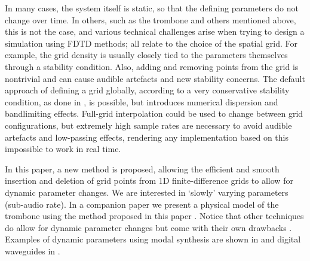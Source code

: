 In many cases, the system itself is static, so that the defining parameters do not change over time. In others, such as the trombone and others mentioned above, this is not the case, and various technical challenges arise when trying to design a simulation using FDTD methods; all relate to the choice of the spatial grid. For example, the grid density is usually closely tied to the parameters themselves through a stability condition.
Also, adding and removing points from the grid is nontrivial and can cause audible artefacts and new stability concerns. The default approach of defining a grid globally, according to a very conservative stability condition, as done in \cite{Willemsen2019}, is possible, but introduces numerical dispersion and bandlimiting effects. Full-grid interpolation \cite[Ch. 5]{bilbao2009} could be used to change between grid configurations, but extremely high sample rates are necessary to avoid audible artefacts and low-passing effects, rendering any implementation based on this impossible to work in real time. 

In this paper, a new method is proposed, allowing the efficient and smooth insertion and deletion of grid points from 1D finite-difference grids to allow for dynamic parameter changes. We are interested in `slowly' varying parameters (sub-audio rate). In a companion paper we present a physical model of the trombone using the method proposed in this paper \cite{Willemsen2021}. Notice that other techniques do allow for dynamic parameter changes but come with their own drawbacks \cite{bilbao2009}. Examples of dynamic parameters using modal synthesis \cite{morrison1993mosaic} are shown in \cite{Mehes2016, Willemsen2017} and digital waveguides \cite{Smith1992} in \cite{Michon2014}. 



